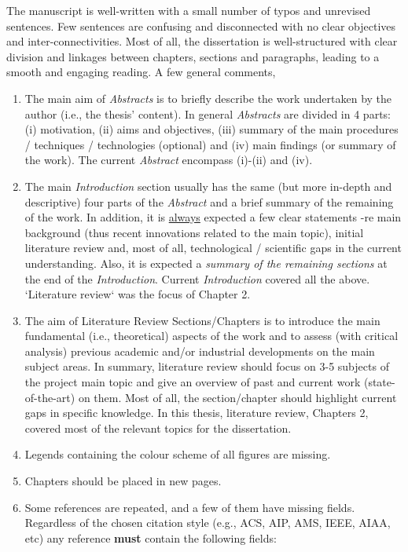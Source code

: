 \documentclass[14pt,twoside]{report}
\begin{document}
The manuscript is well-written with a small number of typos and unrevised sentences. Few sentences are confusing and disconnected with no clear objectives and inter-connectivities. Most of all, the dissertation is well-structured with clear division and linkages between chapters, sections and paragraphs, leading to a smooth and engaging reading. A few general comments,
\begin{enumerate}
%
\item The main aim of {\it Abstracts} is to briefly describe the work undertaken by the author (i.e., the thesis' content). In general {\it Abstracts} are divided in 4 parts: (i) motivation, (ii) aims and objectives, (iii) summary of the main procedures / techniques / technologies (optional) and (iv) main findings (or summary of the work). The current {\it Abstract} encompass (i)-(ii) and (iv).
%
\item The main {\it Introduction} section usually has the same (but more in-depth and descriptive) four parts of the {\it Abstract} and a brief summary of the remaining of the work. In addition, it is \underline{always} expected a few clear statements -re main background (thus recent innovations related to the main topic), initial literature review and, most of all, technological / scientific gaps in the current understanding. Also, it is expected a {\it summary of the remaining sections} at the end of the {\it Introduction}.  Current {\it Introduction} covered all the above. `Literature review` was the focus of Chapter 2.
%
\item The aim of Literature Review Sections/Chapters is to introduce the main fundamental (i.e., theoretical) aspects of the work and to assess (with critical analysis) previous academic and/or industrial developments on the main subject areas. In summary, literature review should focus on 3-5 subjects of the project main topic and give an overview of past and current work (state-of-the-art) on them. Most of all, the section/chapter should highlight current gaps in specific knowledge. In this thesis, literature review, Chapters 2, covered most of the relevant topics for the dissertation.
%
\item Legends containing the colour scheme of all figures are missing. 
%
\item Chapters should be placed in new pages.
%
\item Some references are repeated, and a few of them have missing fields. Regardless of the chosen citation style (e.g., ACS, AIP, AMS, IEEE, AIAA, etc) any reference {\bf must} contain the following fields: 

\end{enumerate}
\end{document}
